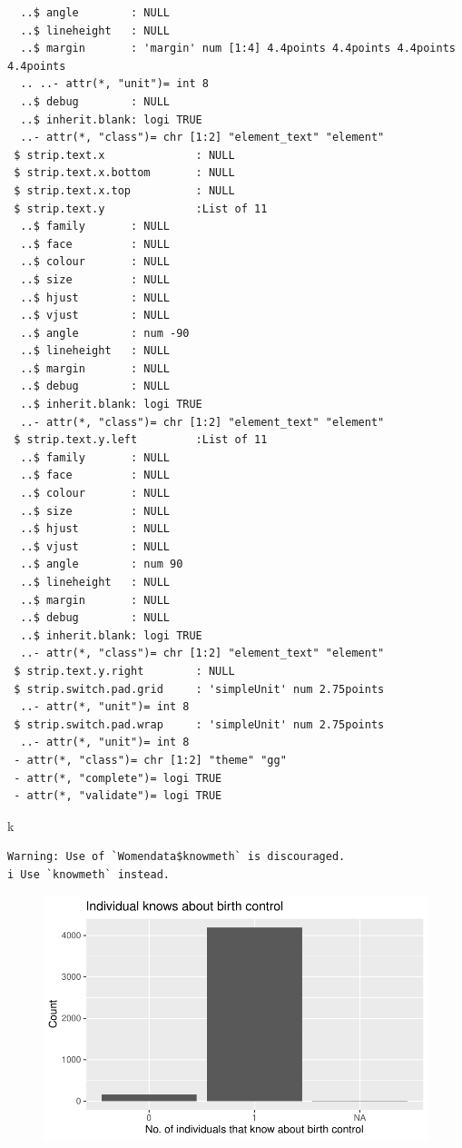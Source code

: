 \documentclass[
  letterpaper,
  DIV=11,
  numbers=noendperiod]{scrartcl}
\newenvironment{Shaded}{\begin{snugshade}}{\end{snugshade}}
\newcommand{\NormalTok}[1]{\textcolor[rgb]{0.00,0.23,0.31}{#1}}
\begin{document}
\begin{verbatim}
  ..$ angle        : NULL
  ..$ lineheight   : NULL
  ..$ margin       : 'margin' num [1:4] 4.4points 4.4points 4.4points 4.4points
  .. ..- attr(*, "unit")= int 8
  ..$ debug        : NULL
  ..$ inherit.blank: logi TRUE
  ..- attr(*, "class")= chr [1:2] "element_text" "element"
 $ strip.text.x              : NULL
 $ strip.text.x.bottom       : NULL
 $ strip.text.x.top          : NULL
 $ strip.text.y              :List of 11
  ..$ family       : NULL
  ..$ face         : NULL
  ..$ colour       : NULL
  ..$ size         : NULL
  ..$ hjust        : NULL
  ..$ vjust        : NULL
  ..$ angle        : num -90
  ..$ lineheight   : NULL
  ..$ margin       : NULL
  ..$ debug        : NULL
  ..$ inherit.blank: logi TRUE
  ..- attr(*, "class")= chr [1:2] "element_text" "element"
 $ strip.text.y.left         :List of 11
  ..$ family       : NULL
  ..$ face         : NULL
  ..$ colour       : NULL
  ..$ size         : NULL
  ..$ hjust        : NULL
  ..$ vjust        : NULL
  ..$ angle        : num 90
  ..$ lineheight   : NULL
  ..$ margin       : NULL
  ..$ debug        : NULL
  ..$ inherit.blank: logi TRUE
  ..- attr(*, "class")= chr [1:2] "element_text" "element"
 $ strip.text.y.right        : NULL
 $ strip.switch.pad.grid     : 'simpleUnit' num 2.75points
  ..- attr(*, "unit")= int 8
 $ strip.switch.pad.wrap     : 'simpleUnit' num 2.75points
  ..- attr(*, "unit")= int 8
 - attr(*, "class")= chr [1:2] "theme" "gg"
 - attr(*, "complete")= logi TRUE
 - attr(*, "validate")= logi TRUE
\end{verbatim}

\begin{Shaded}
\begin{Highlighting}[]
\NormalTok{k}
\end{Highlighting}
\end{Shaded}

\begin{verbatim}
Warning: Use of `Womendata$knowmeth` is discouraged.
i Use `knowmeth` instead.
\end{verbatim}

\begin{figure}[H]

{\centering \includegraphics{Fertility_Rates_Education_Impact_Botswana_files/figure-pdf/unnamed-chunk-23-1.pdf}

}

\end{figure}
\end{document}
